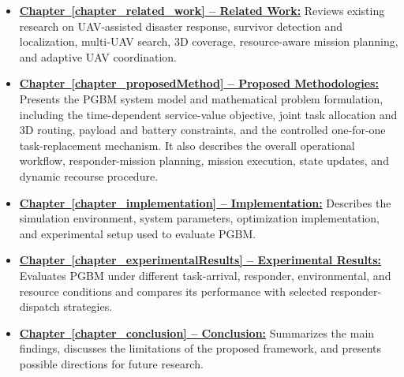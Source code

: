 \begin{itemize}

\item \textbf{
\hyperref[chapter_related_work]
{Chapter~\ref*{chapter_related_work} -- Related Work:}
}
    Reviews existing research on UAV-assisted disaster response,
    survivor detection and localization, multi-UAV search, 3D coverage,
    resource-aware mission planning, and adaptive UAV coordination.

    \item \textbf{\hyperref[chapter_proposedMethod]
    {Chapter~\ref*{chapter_proposedMethod} -- Proposed Methodologies:}}
    Presents the PGBM system model and mathematical problem formulation,
    including the time-dependent service-value objective, joint task allocation
    and 3D routing, payload and battery constraints, and the controlled
    one-for-one task-replacement mechanism. It also describes the overall
    operational workflow, responder-mission planning, mission execution,
    state updates, and dynamic recourse procedure.

    \item \textbf{\hyperref[chapter_implementation]
    {Chapter~\ref*{chapter_implementation} -- Implementation:}}
    Describes the simulation environment, system parameters, optimization
    implementation, and experimental setup used to evaluate PGBM.

    \item \textbf{\hyperref[chapter_experimentalResults]
    {Chapter~\ref*{chapter_experimentalResults} -- Experimental Results:}}
    Evaluates PGBM under different task-arrival, responder, environmental,
    and resource conditions and compares its performance with selected
    responder-dispatch strategies.

    \item \textbf{\hyperref[chapter_conclusion]
    {Chapter~\ref*{chapter_conclusion} -- Conclusion:}}
    Summarizes the main findings, discusses the limitations of the proposed
    framework, and presents possible directions for future research.

\end{itemize}
